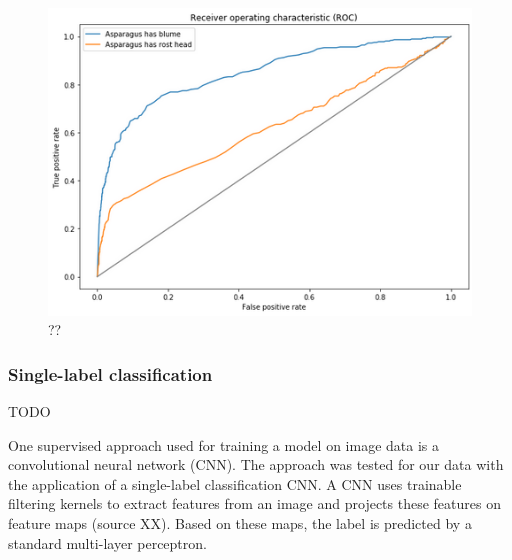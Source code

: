 \\
\begin{figure}[h]
	\centering
	\includegraphics[scale=0.6]{Figures/chapter04/fe_head_roc}
	\decoRule
	\caption[??]{??}
	\label{fig:FeatureEngineeringHeadROC}
\end{figure}



\subsubsection{Single-label classification}

TODO

One supervised approach used for training a model on image data is a convolutional neural network (CNN). The approach was tested for our data with the application of a single-label classification CNN. A CNN uses trainable filtering kernels to extract features from an image and projects these features on feature maps (source XX). Based on these maps, the label is predicted by a standard multi-layer perceptron. \\
\\

